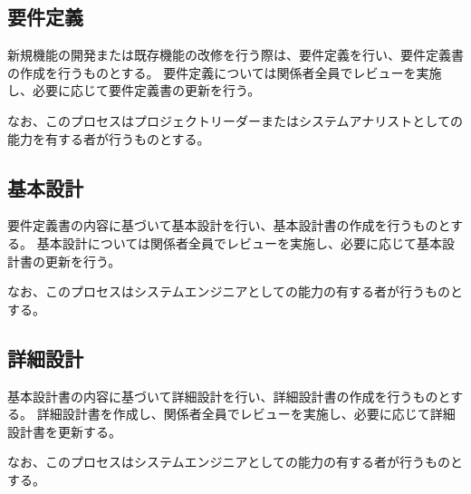 



\subsection{要件定義}
新規機能の開発または既存機能の改修を行う際は、要件定義を行い、要件定義書の作成を行うものとする。
要件定義については関係者全員でレビューを実施し、必要に応じて要件定義書の更新を行う。

なお、このプロセスはプロジェクトリーダーまたはシステムアナリストとしての能力を有する者が行うものとする。

\subsection{基本設計}
要件定義書の内容に基づいて基本設計を行い、基本設計書の作成を行うものとする。
基本設計については関係者全員でレビューを実施し、必要に応じて基本設計書の更新を行う。

なお、このプロセスはシステムエンジニアとしての能力の有する者が行うものとする。

\subsection{詳細設計}
基本設計書の内容に基づいて詳細設計を行い、詳細設計書の作成を行うものとする。
詳細設計書を作成し、関係者全員でレビューを実施し、必要に応じて詳細設計書を更新する。

なお、このプロセスはシステムエンジニアとしての能力の有する者が行うものとする。

